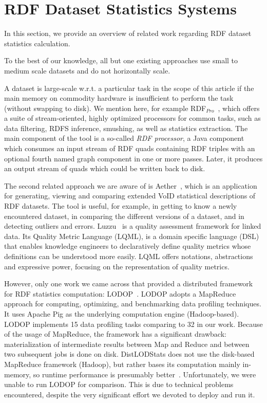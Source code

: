 \section{RDF Dataset Statistics Systems}
In this section, we provide an overview of related work regarding RDF dataset statistics calculation.

To the best of our knowledge, all but one existing approaches use small to medium scale datasets and do not horizontally scale.

A dataset is large-scale w.r.t. a particular task in the scope of this article if the main memory on commodity hardware is insufficient to perform the task (without swapping to disk). 
We mention here, for example RDF$_{Pro}$~\cite{SAC-2015-CorcoglionitiRM}, which offers a suite of stream-oriented, highly optimized processors for common tasks, such as data filtering, RDFS inference, smushing, as well as statistics extraction.
The main component of the tool is a so-called \textit{RDF processor}, a Java component which consumes an input stream of RDF quads containing RDF triples with an optional fourth named graph component in one or more passes.
Later, it produces an output stream of quads which could be written back to disk.

The second related approach we are aware of is Aether~\cite{makela2014aether}, which is an application for generating, viewing and comparing extended VoID statistical descriptions of RDF datasets.
The tool is useful, for example, in getting to know a newly encountered dataset, in comparing the different versions of a dataset, and in detecting outliers and errors.
Luzzu~\cite{debattista2016luzzu} is a quality assessment framework for linked data.
Its Quality Metric Language (LQML), is a domain specific language (DSL) that enables knowledge engineers to declaratively define quality metrics whose definitions can be understood more easily. LQML offers notations, abstractions and expressive power, focusing on the representation of quality metrics.

However, only one work we came across that provided a distributed framework for RDF statistics computation: LODOP~\cite{Forchhammer:PROFILES:14}. 
LODOP adopts a MapReduce approach for computing, optimizing, and benchmarking data profiling techniques.
It uses Apache Pig as the underlying computation engine (Hadoop-based). 
LODOP implements 15 data profiling tasks comparing to 32 in our work. 
Because of the usage of MapReduce, the framework has a significant drawback: materialization of intermediate results between Map and Reduce and between two subsequent jobs is done on disk.
DistLODStats does not use the disk-based MapReduce framework (Hadoop), but rather bases its computation mainly in-memory, so runtime performance is presumably better~\cite{Shi:2015:CTM:2831360.2831365}.
Unfortunately, we were unable to run LODOP for comparison. This is due to technical problems encountered, despite the very significant effort we devoted to deploy and run it.

